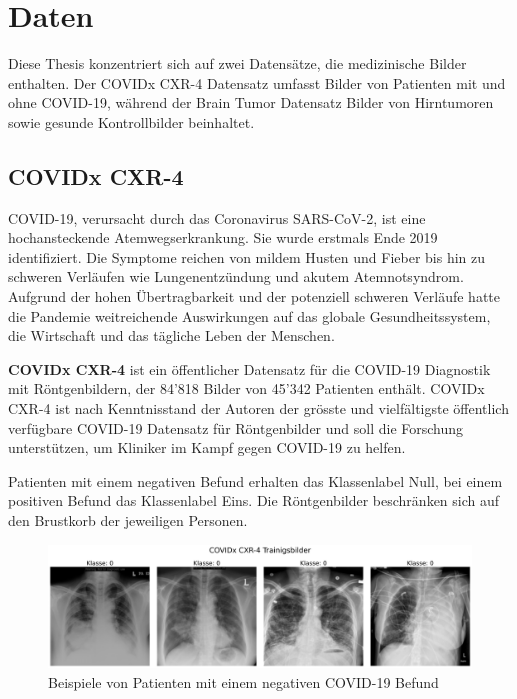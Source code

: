 \section{Daten}\label{chap:Daten} 
Diese Thesis konzentriert sich auf zwei Datensätze, die medizinische Bilder enthalten. Der COVIDx CXR-4 Datensatz umfasst Bilder von Patienten mit und ohne COVID-19, während der Brain Tumor Datensatz Bilder von Hirntumoren sowie gesunde Kontrollbilder beinhaltet.


\subsection{COVIDx CXR-4} \label{chap:COVIDx CXR-4}
COVID-19, verursacht durch das Coronavirus SARS-CoV-2, ist eine hochansteckende Atemwegserkrankung. Sie wurde erstmals Ende 2019 identifiziert. Die Symptome reichen von mildem Husten und Fieber bis hin zu schweren Verläufen wie Lungenentzündung und akutem Atemnotsyndrom. Aufgrund der hohen Übertragbarkeit und der potenziell schweren Verläufe hatte die Pandemie weitreichende Auswirkungen auf das globale Gesundheitssystem, die Wirtschaft und das tägliche Leben der Menschen.

\textbf{COVIDx CXR-4} \cite{wu_covidx_2023} ist ein öffentlicher Datensatz für die COVID-19 Diagnostik mit Röntgenbildern, der 84'818 Bilder von 45'342 Patienten enthält. COVIDx CXR-4 ist nach Kenntnisstand der Autoren der grösste und vielfältigste öffentlich verfügbare COVID-19 Datensatz für Röntgenbilder und soll die Forschung unterstützen, um Kliniker im Kampf gegen COVID-19 zu helfen.

Patienten mit einem negativen Befund erhalten das Klassenlabel Null, bei einem positiven Befund das Klassenlabel Eins. Die Röntgenbilder beschränken sich auf den Brustkorb der jeweiligen Personen.

\begin{figure}[H]
    \centering
    \includegraphics[width=\linewidth]{01-images/03-data/covid19-klasse0.png}
    \caption{Beispiele von Patienten mit einem negativen COVID-19 Befund}
    \label{fig:covid19-beispiele-klasse0-negativ}
\end{figure}

